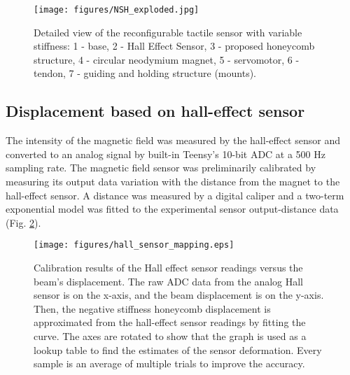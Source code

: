 \documentclass[lettersize,journal]{IEEEtran}
\begin{document}
\begin{figure}[thpb]
\centering
\texttt{[image: figures/NSH\_exploded.jpg]}
\caption {Detailed view of the reconfigurable tactile sensor with variable stiffness: 1 - base, 2 - Hall Effect Sensor, 3 - proposed honeycomb structure, 4 -  circular neodymium magnet, 5 - servomotor, 6 - tendon, 7 - guiding and holding structure (mounts).}
\label{Honeycomb_exploded}
\vspace{-3mm}
\end{figure}

\subsection{Displacement based on hall-effect sensor} %


The intensity of the magnetic field was measured by the hall-effect sensor and converted to an analog signal by built-in Teensy's 10-bit ADC at a 500 Hz sampling rate. The magnetic field sensor was preliminarily calibrated by measuring its output data variation with the distance from the magnet to the hall-effect sensor. A distance was measured by a digital caliper and a two-term exponential model was fitted to the experimental sensor output-distance data (Fig. \ref{hall_sensor_mapping}).
\begin{figure}[thpb]
\texttt{[image: figures/hall\_sensor\_mapping.eps]}
\caption {Calibration results of the Hall effect sensor readings versus the beam's displacement. The raw ADC data from the analog Hall sensor is on the x-axis, and the beam displacement is on the y-axis. Then, the negative stiffness honeycomb displacement is approximated from the hall-effect sensor readings by fitting the curve. The axes are rotated to show that the graph is used as a lookup table to find the estimates of the sensor deformation. Every sample is an average of multiple trials to improve the accuracy.}
\label{hall_sensor_mapping}
\vspace{-1mm}
\end{figure}
 
\end{document}
